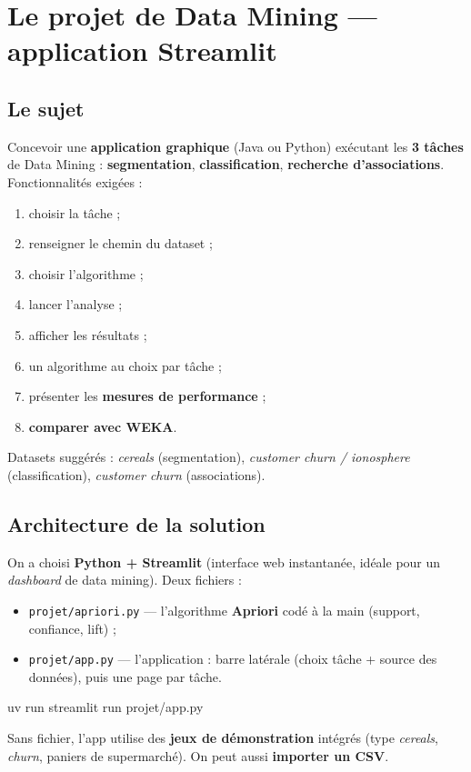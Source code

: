 \chapter{Le projet de Data Mining — application Streamlit}

\section{Le sujet}
\begin{Definition}
Concevoir une \textbf{application graphique} (Java ou Python) exécutant les \textbf{3 tâches}
de Data Mining : \textbf{segmentation}, \textbf{classification}, \textbf{recherche
d'associations}. Fonctionnalités exigées :
\begin{enumerate}[nosep,leftmargin=1.6em]
  \item choisir la tâche ; \item renseigner le chemin du dataset ; \item choisir l'algorithme ;
  \item lancer l'analyse ; \item afficher les résultats ;
  \item un algorithme au choix par tâche ; \item présenter les \textbf{mesures de performance} ;
  \item \textbf{comparer avec WEKA}.
\end{enumerate}
Datasets suggérés : \emph{cereals} (segmentation), \emph{customer churn / ionosphere}
(classification), \emph{customer churn} (associations).
\end{Definition}

\section{Architecture de la solution}
On a choisi \textbf{Python + Streamlit} (interface web instantanée, idéale pour un \emph{dashboard}
de data mining). Deux fichiers :
\begin{itemize}[leftmargin=1.4em,nosep]
  \item \texttt{projet/apriori.py} — l'algorithme \textbf{Apriori} codé à la main (support,
        confiance, lift) ;
  \item \texttt{projet/app.py} — l'application : barre latérale (choix tâche + source des
        données), puis une page par tâche.
\end{itemize}

\begin{Astuce}
\begin{center}\ttfamily uv run streamlit run projet/app.py\end{center}
Sans fichier, l'app utilise des \textbf{jeux de démonstration} intégrés (type
\emph{cereals}, \emph{churn}, paniers de supermarché). On peut aussi \textbf{importer un CSV}.
\end{Astuce}

